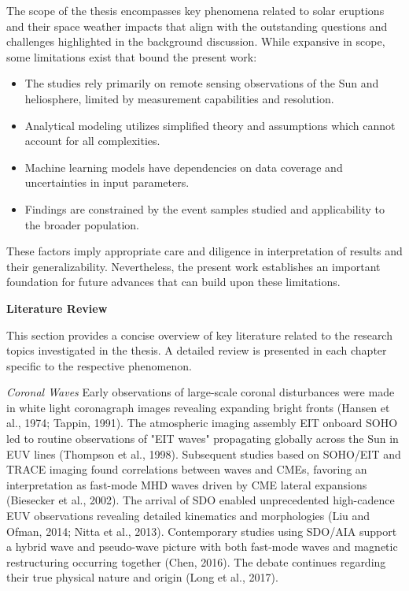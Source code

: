 The scope of the thesis encompasses key phenomena related to solar eruptions and their space weather impacts that align with the outstanding questions and challenges highlighted in the background discussion. While expansive in scope, some limitations exist that bound the present work:

\begin{itemize}
    \item The studies rely primarily on remote sensing observations of the Sun and heliosphere, limited by measurement capabilities and resolution.
    \item Analytical modeling utilizes simplified theory and assumptions which cannot account for all complexities.
    \item Machine learning models have dependencies on data coverage and uncertainties in input parameters.
    \item Findings are constrained by the event samples studied and applicability to the broader population.
\end{itemize}

These factors imply appropriate care and diligence in interpretation of results and their generalizability. Nevertheless, the present work establishes an important foundation for future advances that can build upon these limitations.

\textbf{Literature Review}

This section provides a concise overview of key literature related to the research topics investigated in the thesis. A detailed review is presented in each chapter specific to the respective phenomenon.

\textit{Coronal Waves}
Early observations of large-scale coronal disturbances were made in white light coronagraph images revealing expanding bright fronts (Hansen et al., 1974; Tappin, 1991). The atmospheric imaging assembly EIT onboard SOHO led to routine observations of "EIT waves" propagating globally across the Sun in EUV lines (Thompson et al., 1998). Subsequent studies based on SOHO/EIT and TRACE imaging found correlations between waves and CMEs, favoring an interpretation as fast-mode MHD waves driven by CME lateral expansions (Biesecker et al., 2002). The arrival of SDO enabled unprecedented high-cadence EUV observations revealing detailed kinematics and morphologies (Liu and Ofman, 2014; Nitta et al., 2013). Contemporary studies using SDO/AIA support a hybrid wave and pseudo-wave picture with both fast-mode waves and magnetic restructuring occurring together (Chen, 2016). The debate continues regarding their true physical nature and origin (Long et al., 2017).


